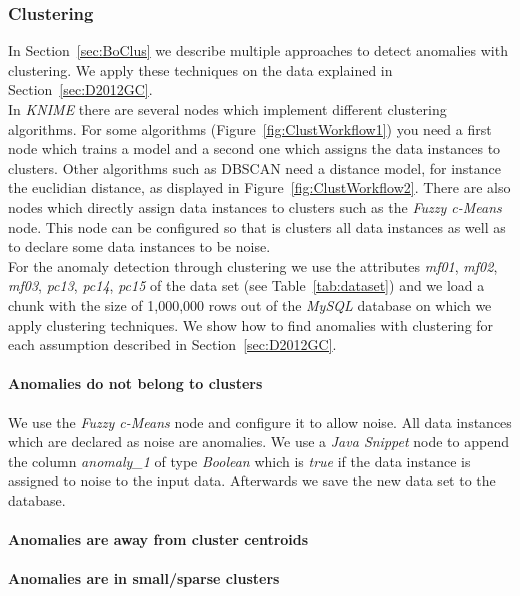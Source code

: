 \documentclass{dima}
\begin{document}
\subsubsection{Clustering}
In Section~\ref{sec:BoClus} we describe multiple approaches to detect anomalies with clustering. We apply these techniques on the data explained in Section~\ref{sec:D2012GC}.\\
In \textit{KNIME} there are several nodes which implement different clustering algorithms. For some algorithms (Figure~\ref{fig:ClustWorkflow1}) you need a first node which trains a model and a second one which assigns the data instances to clusters. Other algorithms such as DBSCAN need a distance model, for instance the euclidian distance, as displayed in Figure~\ref{fig:ClustWorkflow2}. There are also nodes which directly assign data instances to clusters such as the \textit{Fuzzy c-Means} node. This node can be configured so that is clusters all data instances as well as to declare some data instances to be noise.\\
For the anomaly detection through clustering we use the attributes \textit{mf01}, \textit{mf02}, \textit{mf03}, \textit{pc13}, \textit{pc14}, \textit{pc15} of the data set (see Table~\ref{tab:dataset}) and we load a chunk with the size of 1,000,000 rows out of the \textit{MySQL} database on which we apply clustering techniques. We show how to find anomalies with clustering for each assumption described in Section~\ref{sec:D2012GC}.

\paragraph{Anomalies do not belong to clusters}
We use the \textit{Fuzzy c-Means} node and configure it to allow noise. All data instances which are declared as noise are anomalies. We use a \textit{Java Snippet} node to append the column \textit{anomaly\_1} of type \textit{Boolean} which is \textit{true} if the data instance is assigned to noise to the input data. Afterwards we save the new data set to the database.

\paragraph{Anomalies are away from cluster centroids}


\paragraph{Anomalies are in small/sparse clusters}
\end{document}
